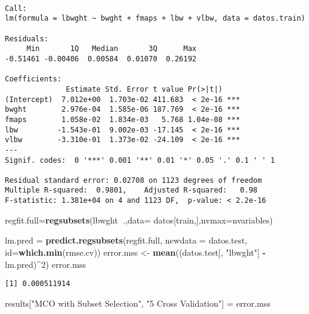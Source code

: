\documentclass[]{article}
\newenvironment{Shaded}{\begin{snugshade}}{\end{snugshade}}
\newcommand{\KeywordTok}[1]{\textcolor[rgb]{0.13,0.29,0.53}{\textbf{#1}}}
\newcommand{\DataTypeTok}[1]{\textcolor[rgb]{0.13,0.29,0.53}{#1}}
\newcommand{\DecValTok}[1]{\textcolor[rgb]{0.00,0.00,0.81}{#1}}
\newcommand{\StringTok}[1]{\textcolor[rgb]{0.31,0.60,0.02}{#1}}
\newcommand{\OperatorTok}[1]{\textcolor[rgb]{0.81,0.36,0.00}{\textbf{#1}}}
\newcommand{\NormalTok}[1]{#1}
\begin{document}
\begin{verbatim}

Call:
lm(formula = lbwght ~ bwght + fmaps + lbw + vlbw, data = datos.train)

Residuals:
     Min       1Q   Median       3Q      Max 
-0.51461 -0.00406  0.00584  0.01070  0.26192 

Coefficients:
              Estimate Std. Error t value Pr(>|t|)    
(Intercept)  7.012e+00  1.703e-02 411.683  < 2e-16 ***
bwght        2.976e-04  1.585e-06 187.769  < 2e-16 ***
fmaps        1.058e-02  1.834e-03   5.768 1.04e-08 ***
lbw         -1.543e-01  9.002e-03 -17.145  < 2e-16 ***
vlbw        -3.310e-01  1.373e-02 -24.109  < 2e-16 ***
---
Signif. codes:  0 '***' 0.001 '**' 0.01 '*' 0.05 '.' 0.1 ' ' 1

Residual standard error: 0.02708 on 1123 degrees of freedom
Multiple R-squared:  0.9801,    Adjusted R-squared:   0.98 
F-statistic: 1.381e+04 on 4 and 1123 DF,  p-value: < 2.2e-16
\end{verbatim}

\begin{Shaded}
\begin{Highlighting}[]
\NormalTok{regfit.full=}\KeywordTok{regsubsets}\NormalTok{(lbwght}\OperatorTok{~}\NormalTok{.,}\DataTypeTok{data=}\NormalTok{ datos[train,],}\DataTypeTok{nvmax=}\NormalTok{nvariables)}

\NormalTok{lm.pred =}\StringTok{ }\KeywordTok{predict.regsubsets}\NormalTok{(regfit.full, }\DataTypeTok{newdata =}\NormalTok{ datos.test, }\DataTypeTok{id=}\KeywordTok{which.min}\NormalTok{(rmse.cv))}
\NormalTok{error.mss <-}\StringTok{ }\KeywordTok{mean}\NormalTok{((datos.test[, }\StringTok{"lbwght"}\NormalTok{] }\OperatorTok{-}\StringTok{ }\NormalTok{lm.pred)}\OperatorTok{^}\DecValTok{2}\NormalTok{)}
\NormalTok{error.mss }
\end{Highlighting}
\end{Shaded}

\begin{verbatim}
[1] 0.000511914
\end{verbatim}

\begin{Shaded}
\begin{Highlighting}[]
\NormalTok{results[}\StringTok{"MCO with Subset Selection"}\NormalTok{, }\StringTok{"5 Cross Validation"}\NormalTok{] =}\StringTok{ }\NormalTok{error.mss}
\end{Highlighting}
\end{Shaded}
\end{document}
